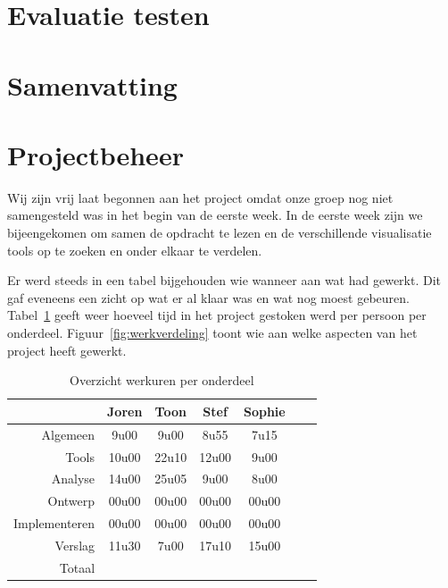 \documentclass[i1]{oss}
\begin{document}
\section{Evaluatie testen}

\section{Samenvatting}

\section{Projectbeheer}

Wij zijn vrij laat begonnen aan het project omdat onze groep nog niet samengesteld was in het begin van de eerste week. In de eerste week zijn we bijeengekomen om samen de opdracht te lezen en de verschillende visualisatie tools op te zoeken en onder elkaar te verdelen. 

Er werd steeds in een tabel bijgehouden wie wanneer aan wat had gewerkt. Dit gaf eveneens een zicht op wat er al klaar was en wat nog moest gebeuren. \\
Tabel~\ref{tab:werkuren} geeft weer hoeveel tijd in het project gestoken werd per persoon per onderdeel. Figuur~\ref{fig:werkverdeling} toont wie aan welke aspecten van het project heeft gewerkt.

\begin{table}[h]
\begin{center}
    \begin{tabular}{ r | c  c  c  c  c  c}
     & Joren & Toon & Stef & Sophie \\ \hline
    Algemeen & 9u00 & 9u00 & 8u55 & 7u15\\
   	Tools & 10u00 & 22u10 & 12u00 & 9u00 \\
	Analyse & 14u00 & 25u05 & 9u00 & 8u00 \\
	Ontwerp & 00u00 & 00u00 & 00u00 & 00u00 \\
	Implementeren & 00u00 & 00u00 & 00u00 & 00u00\\
	Verslag & 11u30 & 7u00 & 17u10 & 15u00 \\
	Totaal & & & & 
    \end{tabular}
    \caption{Overzicht werkuren per onderdeel}
    \label{tab:werkuren}
\end{center}
\end{table}
\end{document}
